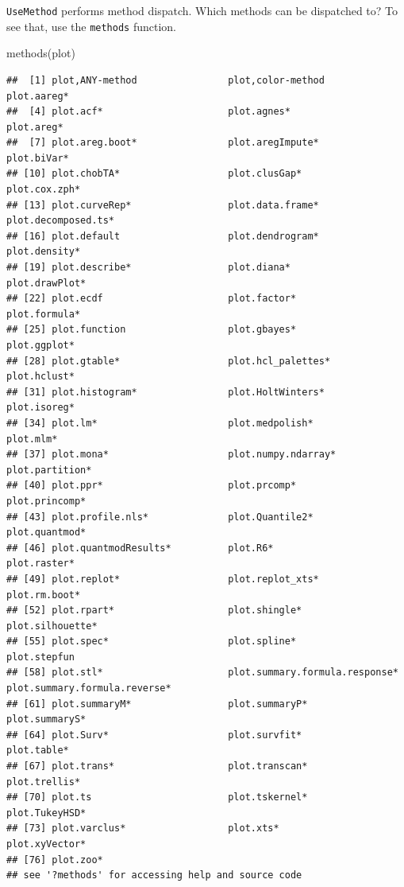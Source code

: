 \documentclass[
  12pt,
]{krantz}
\makeatletter
\newenvironment{Shaded}{\begin{snugshade}}{\end{snugshade}}
\newcommand{\FunctionTok}[1]{\textcolor[rgb]{0,0,0}{#1}}
\newcommand{\NormalTok}[1]{#1}
\newenvironment{kframe}{%
\medskip{}
\setlength{\fboxsep}{.8em}
 \def\at@end@of@kframe{}%
 \ifinner\ifhmode%
  \def\at@end@of@kframe{\end{minipage}}%
  \begin{minipage}{\columnwidth}%
 \fi\fi%
 \def\FrameCommand##1{\hskip\@totalleftmargin \hskip-\fboxsep
 \colorbox{shadecolor}{##1}\hskip-\fboxsep
     \hskip-\linewidth \hskip-\@totalleftmargin \hskip\columnwidth}%
 \MakeFramed {\advance\hsize-\width
   \@totalleftmargin\z@ \linewidth\hsize
   \@setminipage}}%
 {\par\unskip\endMakeFramed%
 \at@end@of@kframe}
\renewenvironment{Shaded}{\begin{kframe}}{\end{kframe}}
\makeatother
\begin{document}
\texttt{UseMethod} performs method dispatch. Which methods can be dispatched to? To see that, use the \texttt{methods} function.

\begin{Shaded}
\begin{Highlighting}[]
\FunctionTok{methods}\NormalTok{(plot)}
\end{Highlighting}
\end{Shaded}

\begin{verbatim}
##  [1] plot,ANY-method                plot,color-method              plot.aareg*                   
##  [4] plot.acf*                      plot.agnes*                    plot.areg*                    
##  [7] plot.areg.boot*                plot.aregImpute*               plot.biVar*                   
## [10] plot.chobTA*                   plot.clusGap*                  plot.cox.zph*                 
## [13] plot.curveRep*                 plot.data.frame*               plot.decomposed.ts*           
## [16] plot.default                   plot.dendrogram*               plot.density*                 
## [19] plot.describe*                 plot.diana*                    plot.drawPlot*                
## [22] plot.ecdf                      plot.factor*                   plot.formula*                 
## [25] plot.function                  plot.gbayes*                   plot.ggplot*                  
## [28] plot.gtable*                   plot.hcl_palettes*             plot.hclust*                  
## [31] plot.histogram*                plot.HoltWinters*              plot.isoreg*                  
## [34] plot.lm*                       plot.medpolish*                plot.mlm*                     
## [37] plot.mona*                     plot.numpy.ndarray*            plot.partition*               
## [40] plot.ppr*                      plot.prcomp*                   plot.princomp*                
## [43] plot.profile.nls*              plot.Quantile2*                plot.quantmod*                
## [46] plot.quantmodResults*          plot.R6*                       plot.raster*                  
## [49] plot.replot*                   plot.replot_xts*               plot.rm.boot*                 
## [52] plot.rpart*                    plot.shingle*                  plot.silhouette*              
## [55] plot.spec*                     plot.spline*                   plot.stepfun                  
## [58] plot.stl*                      plot.summary.formula.response* plot.summary.formula.reverse* 
## [61] plot.summaryM*                 plot.summaryP*                 plot.summaryS*                
## [64] plot.Surv*                     plot.survfit*                  plot.table*                   
## [67] plot.trans*                    plot.transcan*                 plot.trellis*                 
## [70] plot.ts                        plot.tskernel*                 plot.TukeyHSD*                
## [73] plot.varclus*                  plot.xts*                      plot.xyVector*                
## [76] plot.zoo*                     
## see '?methods' for accessing help and source code
\end{verbatim}
\end{document}
